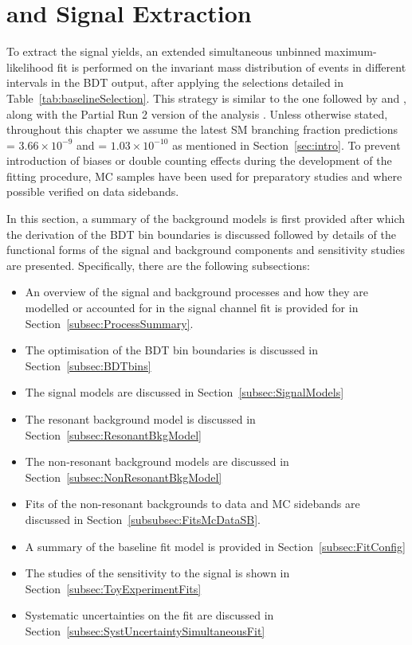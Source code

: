 \section{\Bs and \Bd Signal Extraction}
\label{sec:SignalExtraction}

To extract the \Bds signal yields, an extended simultaneous unbinned maximum-likelihood fit is performed on the invariant mass distribution of \Bds events in different intervals in the BDT output, after applying the selections detailed in Table~\ref{tab:baselineSelection}.
This strategy is similar to the one followed by \lhcb \cite{LHCb:2021vsc} and \cms \cite{CMS:2022mgd}, along with the \atlas Partial Run 2 version of the analysis \cite{ATLAS:2018cur}. Unless otherwise stated, throughout this chapter we assume the latest SM branching fraction predictions \BRBdmumu = $3.66 \times 10^{-9}$ and \BRBsmumu = $1.03 \times 10^{-10}$ as mentioned in Section~\ref{sec:intro}. To prevent introduction of biases or double counting effects during the development of the fitting procedure, MC samples have been used for preparatory studies and where possible verified on data sidebands.

In this section, a summary of the background models is first provided after which the derivation of the BDT bin boundaries is discussed followed by details of the functional forms of the signal and background components and sensitivity studies are presented. 
Specifically, there are the following subsections:
\begin{itemize}
    \item An overview of the signal and background processes and how they are modelled or accounted for in the signal channel fit is provided for in Section~\ref{subsec:ProcessSummary}. 
    \item The optimisation of the BDT bin boundaries is discussed in Section~\ref{subsec:BDTbins} 
    \item The \Bds signal models are discussed in Section~\ref{subsec:SignalModels} 
    \item The resonant \Bhh background model is discussed in Section~\ref{subsec:ResonantBkgModel}
    \item The non-resonant background models are discussed in Section~\ref{subsec:NonResonantBkgModel}
    \item Fits of the non-resonant backgrounds to data and MC sidebands are discussed in Section~\ref{subsubsec:FitsMcDataSB}.
    \item A summary of the baseline fit model is provided in Section~\ref{subsec:FitConfig}
    \item The studies of the sensitivity to the signal is shown in Section~\ref{subsec:ToyExperimentFits}
    \item Systematic uncertainties on the fit are discussed in Section~\ref{subsec:SystUncertaintySimultaneousFit}
\end{itemize}

